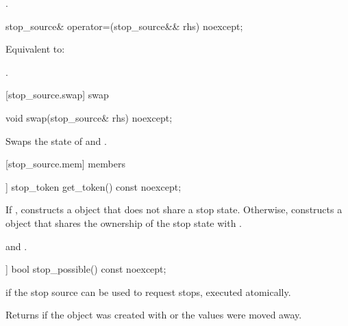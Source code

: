{\begin{itemdescr}
  \pnum\returns {}.
\end{itemdescr}

%
\begin{itemdecl}
stop_source& operator=(stop_source&& rhs) noexcept;
\end{itemdecl}
\begin{itemdescr}
  \pnum\effects Equivalent to: 

  \pnum\returns {}.
\end{itemdescr}

[stop_source.swap]{ swap}

%
\begin{itemdecl}
void swap(stop_source& rhs) noexcept;
\end{itemdecl}

\begin{itemdescr}
 \pnum \effects Swaps the state of  and .
\end{itemdescr}


[stop_source.mem]{ members}

%
\begin{itemdecl}
[[nodiscard]] stop_token get_token() const noexcept;
\end{itemdecl}
\begin{itemdescr}
  \pnum\effects If , constructs a  object
                that does not share a stop state.
                Otherwise, constructs a  object 
                that shares the ownership of the stop state with .

  \pnum\postconditions {}
                and .
\end{itemdescr}


%
\begin{itemdecl}
[[nodiscard]] bool stop_possible() const noexcept;
\end{itemdecl}
\begin{itemdescr}
  \pnum\returns {} if the stop source can be used to request stops, executed atomically.
                \begin{note} Returns  if the object was created with 
                             or the values were moved away.
                             \end{note}
\end{itemdescr}

}
